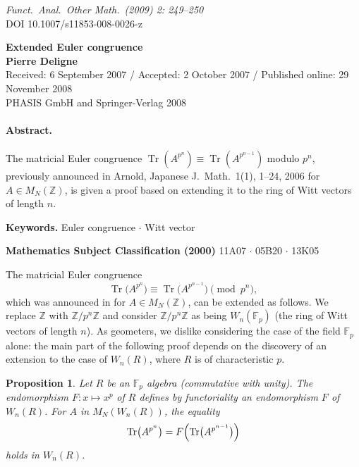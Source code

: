 \documentclass[11pt,a4paper]{article}
\theoremstyle{plain}
\newtheorem{proposition}[theorem]{Proposition}
\theoremstyle{definition}
\DeclareMathOperator{\Tr}{Tr}
\begin{document}
\begin{flushright}
\textit{Funct.\ Anal.\ Other Math.\ (2009) 2: 249--250}\\
DOI 10.1007/s11853-008-0026-z
\end{flushright}

\begin{center}
{\Large\textbf{Extended Euler congruence}}\\[0.5em]
\textbf{Pierre Deligne}\\[0.5em]
\small
Received: 6 September 2007 / Accepted: 2 October 2007 / Published online: 29 November 2008\\
\textcopyright{} PHASIS GmbH and Springer-Verlag 2008
\end{center}

\normalsize
\paragraph{Abstract.}
The matricial Euler congruence $\Tr(A^{p^n}) \equiv \Tr(A^{p^{n-1}})$ modulo $p^n$, previously announced in Arnold, Japanese J.\ Math.\ 1(1), 1--24, 2006 for $A \in M_N(\mathbb{Z})$, is given a proof based on extending it to the ring of Witt vectors of length $n$.

\smallskip\noindent\textbf{Keywords.} Euler congruence $\cdot$ Witt vector

\smallskip\noindent\textbf{Mathematics Subject Classification (2000)} 11A07 $\cdot$ 05B20 $\cdot$ 13K05

\medskip
The matricial Euler congruence
\begin{equation}
\label{eq:1}
\Tr\bigl(A^{p^n}\bigr) \equiv \Tr\bigl(A^{p^{n-1}}\bigr) \pmod{p^n},
\end{equation}
which was announced in \cite{Arnold2006} for $A \in M_N(\mathbb{Z})$, can be extended as follows. We replace $\mathbb{Z}$ with $\mathbb{Z}/p^n\mathbb{Z}$ and consider $\mathbb{Z}/p^n\mathbb{Z}$ as being $W_n(\mathbb{F}_p)$ (the ring of Witt vectors of length $n$). As geometers, we dislike considering the case of the field $\mathbb{F}_p$ alone: the main part of the following proof depends on the discovery of an extension to the case of $W_n(R)$, where $R$ is of characteristic $p$.

\begin{proposition}
Let $R$ be an $\mathbb{F}_p$ algebra (commutative with unity). The endomorphism $F \colon x \mapsto x^p$ of $R$ defines by functoriality an endomorphism $F$ of $W_n(R)$. For $A$ in $M_N(W_n(R))$, the equality
\begin{equation}
\label{eq:2}
\Tr\bigl(A^{p^n}\bigr) = F\Bigl(\Tr\bigl(A^{p^{n-1}}\bigr)\Bigr)
\end{equation}
holds in $W_n(R)$.
\end{proposition}
\end{document}
